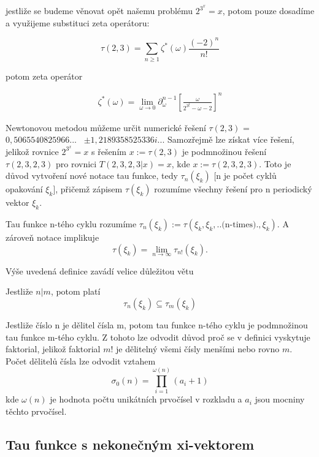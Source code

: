 jestliže se budeme věnovat opět našemu problému \(2^{3^x}=x\),
potom pouze dosadíme a využijeme substituci zeta operátoru:

\begin{equation}
      \tau(2, 3) = \sum_{n \geq 1} \zeta^*(\omega) \frac{(-2)^n}{n!} 
\end{equation}

potom zeta operátor

\begin{align}
      \zeta^*(\omega) = \lim_{\omega \to 0} \partial_{\omega}^{n-1}\left[ 
      \frac{\omega}{2^{3^\xi} - \omega - 2} \right]^n 
\end{align}

Newtonovou metodou můžeme určit numerické řešení \(\tau(2, 3)\) = 
\(0,5065540825966... \) \ \(\pm 1,2189358525336i...\) Samozřejmě 
lze získat více řešení, jelikož rovnice \(2^{3^x}=x\) s řešením 
\(x := \tau(2, 3)\) je podmnožinou řešení \(\tau(2, 3, 2, 3)\)
pro rovnici \(T(2, 3, 2, 3 | x) = x\), kde \(x :=\tau(2, 3, 2, 3)\).
Toto je důvod vytvoření nové notace tau funkce, tedy \(\tau_n(\xi_k)\) 
[n je počet cyklů opakování \(\xi_k\)], přičemž zápisem \(\tau(\xi_k)\)
rozumíme všechny řešení pro n periodický vektor \(\xi_k\).

\begin{definition}
      Tau funkce n-tého cyklu rozumíme \(\tau_n(\xi_k) := 
      \tau(\xi_k, \xi_k, ..\mbox{(n-times)}. , \xi_k)\). A 
      zároveň notace implikuje 
      \[\tau(\xi_k) = \lim_{n\to \infty}\tau_{n!}(\xi_k).\]
\end{definition}

Výše uvedená definice zavádí velice důležitou větu

\begin{theorem}
      Jestliže \(n | m\), potom platí
      \[\tau_n(\xi_k) \subseteq \tau_m(\xi_k)\]
\end{theorem}

Jestliže číslo n je dělitel čísla m, potom tau funkce
n-tého cyklu je podmnožinou tau funkce m-tého cyklu. 
Z tohoto lze odvodit důvod proč se v definici vyskytuje
faktorial, jelikož faktorial \(m!\) je dělitelný všemi 
čísly menšími nebo rovno \(m\). Počet dělitelů čísla lze
odvodit vztahem
\[\sigma_0(n) = \prod_{i=1}^{\omega(n)}(a_i+1)\]kde 
\(\omega(n)\) je hodnota počtu unikátních prvočísel v
rozkladu a \(a_i\) jsou mocniny těchto prvočísel.

\subsection{Tau funkce s nekonečným xi-vektorem}

